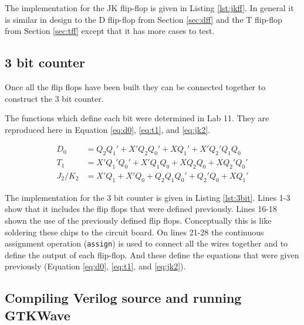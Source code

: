 \documentclass[12pt]{article}
\begin{document}
The implementation for the JK flip-flop is given in Listing \ref{lst:jkff}.
In general it is similar in design to the D flip-flop from Section \ref{sec:dff}
and the T flip-flop from Section \ref{sec:tff} except that it has more
cases to test.



\subsection{3 bit counter}

Once all the flip flops have been built they can be connected
together to construct the 3 bit counter.

The functions which define each bit were determined in
Lab 11\cite{mahler144lab11}.
They are reproduced here in Equation \ref{eq:d0},
\ref{eq:t1}, and \ref{eq:jk2}.

\begin{align}
	D_0 &= Q_2 Q_1' + X' Q_2 Q_0' + X Q_1' + X' Q_2' Q_1 Q_0 \label{eq:d0} \\
	T_1 &= X' Q_1' Q_0' + X' Q_1 Q_0 + X Q_2 Q_0 + X Q_2' Q_0' \label{eq:t1} \\
	J_2/K_2 &= X' Q_1 + X' Q_0 + Q_2 Q_1 Q_0' + Q_2' Q_0 + X Q_1' \label{eq:jk2}
\end{align}

The implementation for the 3 bit counter is given in Listing \ref{lst:3bit}.
Lines 1-3 show that it includes the flip flops that were defined previously.
Lines 16-18 shown the use of the previously defined flip flops.
Conceptually this is like soldering these chips to the circuit board.
On lines 21-28 the continuous assignment operation (\verb+assign+)
is used to connect all the wires together and to define the output of
each flip-flop.
And these define the equations that were given previously
(Equation \ref{eq:d0}, \ref{eq:t1}, and \ref{eq:jk2}).




\subsection{Compiling Verilog source and running GTKWave}
\end{document}
